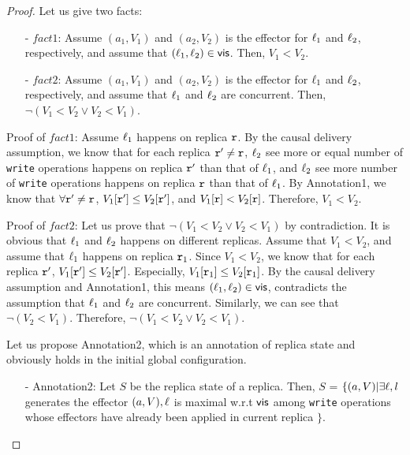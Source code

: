 \begin {proof}

Let us give two facts:

\begin{itemize}
\setlength{\itemsep}{0.5pt}
\item[-] $fact1$: Assume $(a_1,V_1)$ and $(a_2,V_2)$ is the effector for $\ell_1$ and $\ell_2$, respectively, and assume that $(\ell_1,\ell_2) \in \mathsf{vis}$. Then, $V_1 < V_2$.
\item[-] $fact2$: Assume $(a_1,V_1)$ and $(a_2,V_2)$ is the effector for $\ell_1$ and $\ell_2$, respectively, and assume that $\ell_1$ and $\ell_2$ are concurrent. Then, $\neg (V_1 < V_2 \vee V_2 < V_1)$.
\end{itemize}


\noindent Proof of $fact1$: Assume $\ell_1$ happens on replica $\mathtt{r}$. By the causal delivery assumption, we know that for each replica $\mathtt{r}' \neq \mathtt{r}$, $\ell_2$ see more or equal number of {\tt write} operations happens on replica $\mathtt{r}'$ than that of $\ell_1$, and $\ell_2$ see more number of {\tt write} operations happens on replica $\mathtt{r}$ than that of $\ell_1$. By Annotation1, we know that $\forall \mathtt{r}' \neq \mathtt{r}$, $V_1[\mathtt{r}'] \leq V_2[\mathtt{r}']$, and $V_1[\mathtt{r}] < V_2[\mathtt{r}]$. Therefore, $V_1 < V_2$.

\noindent Proof of $fact2$: Let us prove that $\neg (V_1 < V_2 \vee V_2 < V_1)$ by contradiction. It is obvious that $\ell_1$ and $\ell_2$ happens on different replicas. Assume that $V_1 < V_2$, and assume that $\ell_1$ happens on replica $\mathtt{r}_1$. Since $V_1 < V_2$, we know that for each replica $\mathtt{r}'$, $V_1[\mathtt{r}'] \leq V_2[\mathtt{r}']$. Especially, $V_1[\mathtt{r}_1] \leq V_2[\mathtt{r}_1]$. By the causal delivery assumption and Annotation1, this means $(\ell_1,\ell_2) \in \mathsf{vis}$, contradicts the assumption that $\ell_1$ and $\ell_2$ are concurrent. Similarly, we can see that $\neg (V_2 < V_1)$. Therefore, $\neg (V_1 < V_2 \vee V_2 < V_1)$.

Let us propose Annotation2, which is an annotation of replica state and obviously holds in the initial global configuration.

\begin{itemize}
\setlength{\itemsep}{0.5pt}
\item[-] Annotation2: Let $S$ be the replica state of a replica. Then, $S$ =  $\{ (a,V) \vert \exists \ell, l$ generates the effector $(a,V), \ell$ is maximal w.r.t $\mathsf{vis}$ among {\tt write} operations whose effectors have already been applied in current replica $\}$.
\end{itemize}


\end{proof}
